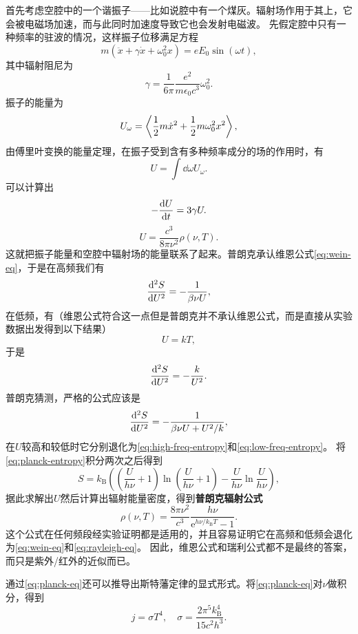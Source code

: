 \documentclass[UTF8, a4paper]{ctexart}
\newcommand*{\ee}{\mathrm{e}}
\begin{document}
首先考虑空腔中的一个谐振子——比如说腔中有一个煤灰。辐射场作用于其上，它会被电磁场加速，而与此同时加速度导致它也会发射电磁波。
先假定腔中只有一种频率的驻波的情况，这样振子位移满足方程
\[
    m(\ddot{x} + \gamma \dot{x} + \omega_0^2 x) = e E_0 \sin(\omega t),
\]
其中辐射阻尼为
\[
    \gamma = \frac{1}{6\pi} \frac{e^2}{m \epsilon_0 c^3} \omega_0^2.
\]
振子的能量为
\[
    U_\omega = \expval{\frac{1}{2} m \dot{x}^2 + \frac{1}{2} m \omega_0^2 x^2},
\]
由傅里叶变换的能量定理，在振子受到含有多种频率成分的场的作用时，有
\[
    U = \int \dd{\omega} U_\omega.
\]
可以计算出
\[
    - \dv{U}{t} = 3\gamma U.
\]
\begin{equation}
    U = \frac{c^3}{8\pi \nu^2} \rho(\nu, T).
\end{equation}
这就把振子能量和空腔中辐射场的能量联系了起来。普朗克承认维恩公式\eqref{eq:wein-eq}，于是在高频我们有
\begin{equation}
    \dv[2]{S}{U} = - \frac{1}{\beta \nu U},
    \label{eq:high-freq-entropy}
\end{equation}
在低频，有（维恩公式符合这一点但是普朗克并不承认维恩公式，而是直接从实验数据出发得到以下结果）
\[
    U = k T,
\]
于是
\begin{equation}
    \dv[2]{S}{U} = - \frac{k}{U^2}.
    \label{eq:low-freq-entropy}
\end{equation}
普朗克猜测，严格的公式应该是
\begin{equation}
    \dv[2]{S}{U} = - \frac{1}{\beta \nu U + U^2 / k},
    \label{eq:planck-entropy}
\end{equation}
在$U$较高和较低时它分别退化为\eqref{eq:high-freq-entropy}和\eqref{eq:low-freq-entropy}。
将\eqref{eq:planck-entropy}积分两次之后得到
\begin{equation}
    S = k_\text{B} \left( \left( \frac{U}{h \nu} + 1 \right) \ln \left( \frac{U}{h \nu} + 1 \right) - \frac{U}{h \nu} \ln \frac{U}{h \nu} \right),
    \label{eq:planck-entropy-energy}
\end{equation}
据此求解出$U$然后计算出辐射能量密度，得到\textbf{普朗克辐射公式}
\begin{equation}
    \rho(\nu, T) = \frac{8\pi \nu^2}{c^3} \frac{h \nu}{\ee^{h \nu / k_\text{B} T} - 1}.
    \label{eq:planck-eq}
\end{equation}
这个公式在任何频段经实验证明都是适用的，并且容易证明它在高频和低频会退化为\eqref{eq:wein-eq}和\eqref{eq:rayleigh-eq}。
因此，维恩公式和瑞利公式都不是最终的答案，而只是紫外/红外的近似而已。

通过\eqref{eq:planck-eq}还可以推导出斯特藩定律的显式形式。将\eqref{eq:planck-eq}对$\nu$做积分，得到
\begin{equation}
    j = \sigma T^4, \quad \sigma = \frac{2 \pi^5 k_\text{B}^4}{15 c^2 h^3}.
\end{equation}
\end{document}
